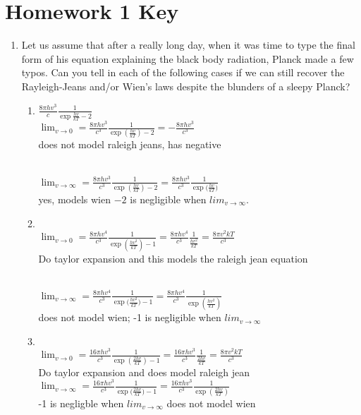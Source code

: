 \documentclass{article}
\begin{document}
\section*{Homework 1 Key}

\begin{enumerate}%

\item Let us assume that after a really long day, when it was time to type the final form of his 
equation explaining the black body radiation, Planck made a few typos. Can you tell in each 
of the following cases if we can still recover the Rayleigh-Jeans and/or Wien’s laws despite 
the blunders of a sleepy Planck? 
\begin{enumerate}
\item $\frac{8\pi hv^3}{c}\frac{1}{\exp{\frac{hv}{kT}}-2}$
\\$\lim_{v\rightarrow 0}=\frac{8\pi hv^3}{c^3}\frac{1}{\exp({\frac{hv}{kT}})-2} = -\frac{8\pi hv^3}{c^3} $ 
\\does not model raleigh jeans, has negative

\\$\lim_{v\rightarrow \infty}=\frac{8\pi hv^3}{c^3}\frac{1}{\exp({\frac{hv}{kT}})-2} =  \frac{8\pi hv^3}{c^3}\frac{1}{{\exp(\frac{hv}{kT}})}$ 
\\yes, models wien $-2$ is negligible when $lim_{v\rightarrow\infty}$.

\item \\ $\lim_{v\rightarrow 0}=\frac{8\pi hv^4}{c^3}\frac{1}{\exp({\frac{hv^2}{kT}})-1} = \frac{8\pi hv^4}{c^3}\frac{1}{{\frac{hv^2}{kT}}} = \frac{8\pi v^2kT}{c^3}$ 
\\Do taylor expansion and this models the raleigh jean equation

\\ $\lim_{v\rightarrow \infty}=\frac{8\pi hv^4}{c^3}\frac{1}{\exp{(\frac{hv^2}{kT}})-1} =  \frac{8\pi hv^4}{c^3}\frac{1}{\exp(\frac{hv^2}{kT})} $
\\does not model wien; -1 is negligible when $lim_{v\rightarrow\infty}$
\item
\\ $\lim_{v\rightarrow 0}=\frac{16\pi hv^3}{c^3}\frac{1}{\exp(\frac{2hv}{kT})-1} = \frac{16\pi hv^3}{c^3}\frac{1}{{\frac{2hv}{kT}}} = \frac{8\pi v^2kT}{c^3}$ 
\\Do taylor expansion and does model raleigh jean
\\ $\lim_{v\rightarrow \infty}=\frac{16\pi hv^3}{c^3}\frac{1}{\exp{(\frac{2hv}{kT}})-1} =  \frac{16\pi hv^3}{c^3}\frac{1}{\exp({\frac{2hv}{kT}})} $
\\-1 is negligble when $lim_{v\rightarrow\infty}$ does not model wien
\end{enumerate}


\end{enumerate}
\end{document}

